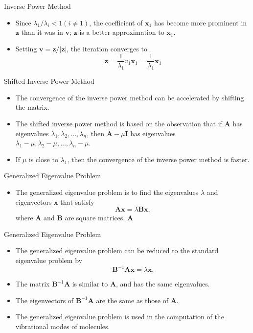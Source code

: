 \documentclass{beamer}
\begin{document}
\begin{frame}{Inverse Power Method}
    \begin{itemize}
        \item Since $\lambda_1 / \lambda_i<1(i \neq 1)$,  the coefficient of $\mathbf{x}_1$ has become more prominent
         in $\mathbf{z}$ than it was in $\mathbf{v}$; $\mathbf{z}$ is a better approximation to $\mathbf{x}_1$. 
         \item Setting $\mathbf{v}=\mathbf{z}/|\mathbf{z}|$, the iteration converges to
         \[ 
         \mathbf{z}=\frac{1}{\lambda_1} v_1 \mathbf{x}_1=\frac{1}{\lambda_1} \mathbf{x}_1
         \]
    \end{itemize}
\end{frame}
\begin{frame}{Shifted Inverse Power Method}
    \begin{itemize}
        \item The convergence of the inverse power method can be accelerated by shifting the matrix.
        \item The shifted inverse power method is based on the observation that if $\mathbf{A}$ has eigenvalues $\lambda_1, \lambda_2, \ldots, \lambda_n$, then $\mathbf{A}-\mu \mathbf{I}$ has eigenvalues $\lambda_1-\mu, \lambda_2-\mu, \ldots, \lambda_n-\mu$.
        \item If $\mu$ is close to $\lambda_1$, then the convergence of the inverse power method is faster.
    \end{itemize}
\end{frame}
\begin{frame}{Generalized Eigenvalue Problem}
    \begin{itemize}
    \item The generalized eigenvalue problem is to find the eigenvalues $\lambda$ and eigenvectors $\mathbf{x}$ that satisfy
    \[
    \mathbf{A x}=\lambda \mathbf{B x},
    \]
    where $\mathbf{A}$ and $\mathbf{B}$ are square matrices. $\mathbf{A}$
    \end{itemize}
\end{frame}
\begin{frame}{Generalized Eigenvalue Problem}
    \begin{itemize}
        \item The generalized eigenvalue problem can be reduced to the standard eigenvalue problem by 
        \[
        \mathbf{B}^{-1} \mathbf{A x}=\lambda \mathbf{x}.
        \]
        \item The matrix $\mathbf{B}^{-1} \mathbf{A}$ is similar to $\mathbf{A}$, and has the same eigenvalues.
        \item The eigenvectors of $\mathbf{B}^{-1} \mathbf{A}$ are the same as those of $\mathbf{A}$.
        \item The generalized eigenvalue problem is used in the computation of the vibrational modes of molecules.
    \end{itemize}
\end{frame}
\end{document}

